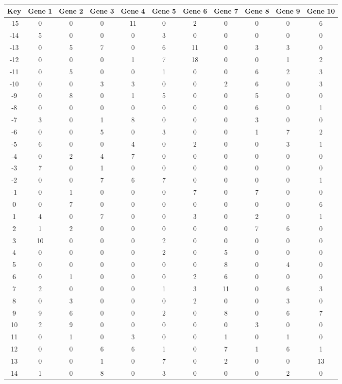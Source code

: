 \begin{tabular}{|c|c|c|c|c|c|c|c|c|c|c|}
\hline
Key & Gene 1 & Gene 2 & Gene 3 & Gene 4 & Gene 5 & Gene 6 & Gene 7 & Gene 8 & Gene 9 & Gene 10 \\
\hline
-15 & 0 & 0 & 0 & 11 & 0 & 2 & 0 & 0 & 0 & 6 \\
-14 & 5 & 0 & 0 & 0 & 3 & 0 & 0 & 0 & 0 & 0 \\
-13 & 0 & 5 & 7 & 0 & 6 & 11 & 0 & 3 & 3 & 0 \\
-12 & 0 & 0 & 0 & 1 & 7 & 18 & 0 & 0 & 1 & 2 \\
-11 & 0 & 5 & 0 & 0 & 1 & 0 & 0 & 6 & 2 & 3 \\
-10 & 0 & 0 & 3 & 3 & 0 & 0 & 2 & 6 & 0 & 3 \\
-9 & 0 & 8 & 0 & 1 & 5 & 0 & 0 & 5 & 0 & 0 \\
-8 & 0 & 0 & 0 & 0 & 0 & 0 & 0 & 6 & 0 & 1 \\
-7 & 3 & 0 & 1 & 8 & 0 & 0 & 0 & 3 & 0 & 0 \\
-6 & 0 & 0 & 5 & 0 & 3 & 0 & 0 & 1 & 7 & 2 \\
-5 & 6 & 0 & 0 & 4 & 0 & 2 & 0 & 0 & 3 & 1 \\
-4 & 0 & 2 & 4 & 7 & 0 & 0 & 0 & 0 & 0 & 0 \\
-3 & 7 & 0 & 1 & 0 & 0 & 0 & 0 & 0 & 0 & 0 \\
-2 & 0 & 0 & 7 & 6 & 7 & 0 & 0 & 0 & 0 & 1 \\
-1 & 0 & 1 & 0 & 0 & 0 & 7 & 0 & 7 & 0 & 0 \\
0 & 0 & 7 & 0 & 0 & 0 & 0 & 0 & 0 & 0 & 6 \\
1 & 4 & 0 & 7 & 0 & 0 & 3 & 0 & 2 & 0 & 1 \\
2 & 1 & 2 & 0 & 0 & 0 & 0 & 0 & 7 & 6 & 0 \\
3 & 10 & 0 & 0 & 0 & 2 & 0 & 0 & 0 & 0 & 0 \\
4 & 0 & 0 & 0 & 0 & 2 & 0 & 5 & 0 & 0 & 0 \\
5 & 0 & 0 & 0 & 0 & 0 & 0 & 8 & 0 & 4 & 0 \\
6 & 0 & 1 & 0 & 0 & 0 & 2 & 6 & 0 & 0 & 0 \\
7 & 2 & 0 & 0 & 0 & 1 & 3 & 11 & 0 & 6 & 3 \\
8 & 0 & 3 & 0 & 0 & 0 & 2 & 0 & 0 & 3 & 0 \\
9 & 9 & 6 & 0 & 0 & 2 & 0 & 8 & 0 & 6 & 7 \\
10 & 2 & 9 & 0 & 0 & 0 & 0 & 0 & 3 & 0 & 0 \\
11 & 0 & 1 & 0 & 3 & 0 & 0 & 1 & 0 & 1 & 0 \\
12 & 0 & 0 & 6 & 6 & 1 & 0 & 7 & 1 & 6 & 1 \\
13 & 0 & 0 & 1 & 0 & 7 & 0 & 2 & 0 & 0 & 13 \\
14 & 1 & 0 & 8 & 0 & 3 & 0 & 0 & 0 & 2 & 0 \\
\hline
\end{tabular}